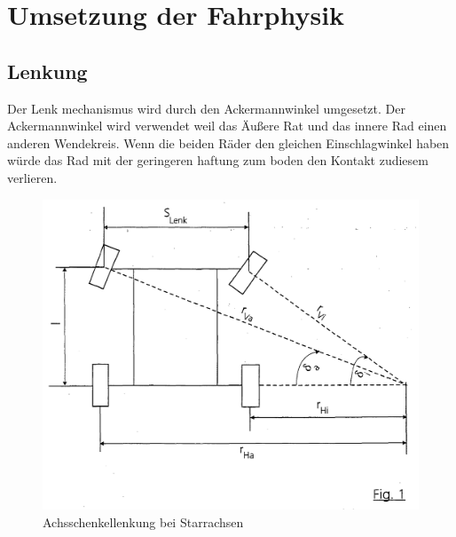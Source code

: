 

\section{Umsetzung der Fahrphysik}



\subsection{Lenkung}
Der Lenk mechanismus wird durch den Ackermannwinkel umgesetzt.
Der Ackermannwinkel wird verwendet weil das Äußere Rat und das innere Rad einen anderen Wendekreis. Wenn die beiden Räder den gleichen Einschlagwinkel haben würde das Rad mit der geringeren haftung zum boden den Kontakt zudiesem verlieren.\\
\begin{figure}[htp]
    \centering
    \includegraphics[width=(\textwidth/2)]{images/Ackermann.png}
    \caption{Achsschenkellenkung bei Starrachsen}
    \label{fig:Achsschenkellenkung bei Starrachsen}
\end{figure}

